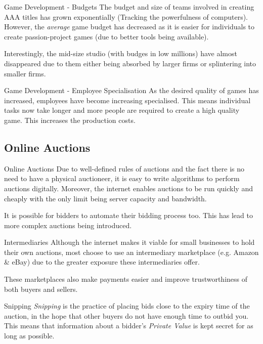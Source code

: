 \documentclass[11pt,a4paper]{article}
\begin{document}
  \begin{remark}{Game Development - Budgets}
    The budget and size of teams involved in creating AAA titles has grown exponentially (Tracking the powerfulness of computers). However, the \textit{average} game budget has decreased as it is easier for individuals to create passion-project games (due to better tools being available).
    \par Interestingly, the mid-size studio (with budges in low millions) have almost disappeared due to them either being absorbed by larger firms or splintering into smaller firms.
  \end{remark}

  \begin{remark}{Game Development - Employee Specialisation}
    As the desired quality of games has increased, employees have become increasing specialised. This means individual tasks now take longer and more people are required to create a high quality game. This increases the production costs.
  \end{remark}

\subsection{Online Auctions} \label{sec_OnlineAuctions}

  \begin{remark}{Online Auctions}
    Due to well-defined rules of auctions and the fact there is no need to have a physical auctioneer, it is easy to write algorithms to perform auctions digitally. Moreover, the internet enables auctions to be run quickly and cheaply with the only limit being server capacity and bandwidth.
    \par It is possible for bidders to automate their bidding process too. This has lead to more complex auctions being introduced.
  \end{remark}

  \begin{remark}{Intermediaries}
    Although the internet makes it viable for small businesses to hold their own auctions, most choose to use an intermediary marketplace (e.g. Amazon \& eBay) due to the greater exposure these intermediaries offer.
    \par These marketplaces also make payments easier and improve trustworthiness of both buyers and sellers.
  \end{remark}

  \begin{definition}{Snipping}
    \textit{Snipping} is the practice of placing bids close to the expiry time of the auction, in the hope that other buyers do not have enough time to outbid you. This means that information about a bidder's \textit{Private Value} is kept secret for as long as possible.
  \end{definition}
\end{document}
